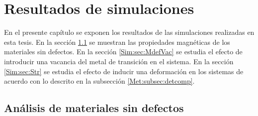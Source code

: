 \chapter{Resultados de simulaciones} \label{cap:Sim}
En el presente cap\'itulo se exponen los resultados de las simulaciones realizadas en esta tesis. En la secci\'on \ref{Sim:sec:MSdef} se muestran las propiedades magn\'eticas de los materiales sin defectos. En la secci\'on \ref{Sim:sec:MdefVac} se estudia el efecto de introducir una vacancia del metal de transición en el sistema. En la secci\'on \ref{Sim:sec:Str} se estudia el efecto de inducir una deformaci\'on en los sistemas de acuerdo con lo descrito en la subsecci\'on \ref{Met:subsec:detcomp}.
\section{An\'alisis de materiales sin defectos} \label{Sim:sec:MSdef}
